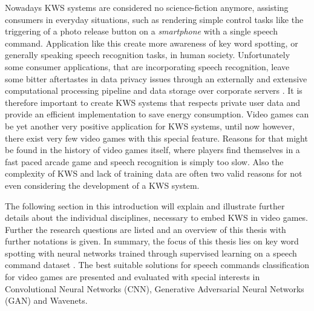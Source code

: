Nowadays KWS systems are considered no science-fiction anymore, assisting consumers in everyday situations, such as rendering simple control tasks like the triggering of a photo release button on a \emph{smartphone} with a single speech command.
Application like this create more awareness of key word spotting, or generally speaking speech recognition tasks, in human society.
Unfortunately some consumer applications, that are incorporating speech recognition, leave some bitter aftertastes in data privacy issues through an externally and extensive computational processing pipeline and data storage over corporate servers \cite{Tang2018}.
It is therefore important to create KWS systems that respects private user data and provide an efficient implementation to save energy consumption. %
Video games can be yet another very positive application for KWS systems, until now however, there exist very few video games with this special feature.
Reasons for that might be found in the history of video games itself, where players find themselves in a fast paced arcade game and speech recognition is simply too slow.
Also the complexity of KWS and lack of training data are often two valid reasons for not even considering the development of a KWS system.

The following section in this introduction will explain and illustrate further details about the individual disciplines, necessary to embed KWS in video games. 
Further the research questions are listed and an overview of this thesis with further notations is given.
In summary, the focus of this thesis lies on key word spotting with neural networks trained through supervised learning on a speech command dataset \cite{Warden2018}.
The best suitable solutions for speech commands classification for video games are presented and evaluated with special interests in Convolutional Neural Networks (CNN), Generative Adversarial Neural Networks (GAN) and Wavenets.




